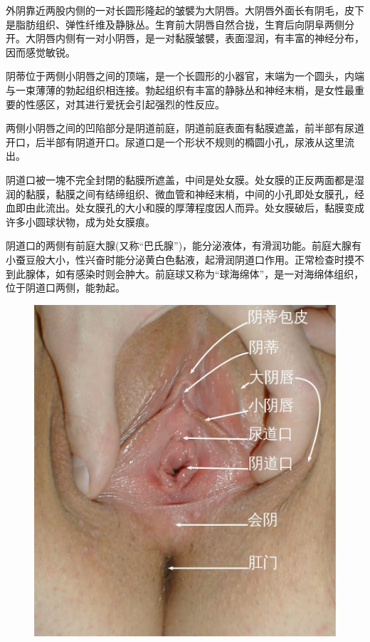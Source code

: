 \documentclass[12pt,UTF8]{ctexbook}
\begin{document}
外阴靠近两股内侧的一对长圆形隆起的皱襞为大阴唇。大阴唇外面长有阴毛，皮下是脂肪组织、弹性纤维及静脉丛。生育前大阴唇自然合拢，生育后向阴阜两侧分开。大阴唇内侧有一对小阴唇，是一对黏膜皱襞，表面湿润，有丰富的神经分布，因而感觉敏锐。

阴蒂位于两侧小阴唇之间的顶端，是一个长圆形的小器官，末端为一个圆头，内端与一束薄薄的勃起组织相连接。勃起组织有丰富的静脉丛和神经末梢，是女性最重要的性感区，对其进行爱抚会引起强烈的性反应。

两侧小阴唇之间的凹陷部分是阴道前庭，阴道前庭表面有黏膜遮盖，前半部有尿道开口，后半部有阴道开口。尿道口是一个形状不规则的橢圆小孔，尿液从这里流出。

阴道口被一塊不完全封閉的黏膜所遮盖，中间是处女膜。处女膜的正反两面都是湿润的黏膜，黏膜之间有结缔组织、微血管和神经末梢，中间的小孔即处女膜孔，经血即由此流出。处女膜孔的大小和膜的厚薄程度因人而异。处女膜破后，黏膜变成许多小圆球状物，成为处女膜痕。

阴道口的两侧有前庭大腺(又称“巴氏腺”)，能分泌液体，有滑润功能。前庭大腺有小蚕豆般大小，性兴奋时能分泌黄白色黏液，起滑润阴道口作用。正常检查时摸不到此腺体，如有感染时则会肿大。前庭球又称为“球海绵体”，是一对海绵体组织，位于阴道口两侧，能勃起。

\begin{figure}[htbp]
	\centering
	\includegraphics[width=0.7\linewidth]{1}
	\caption{}
	\label{fig:1}
\end{figure}
\end{document}
